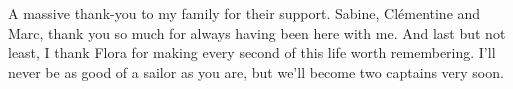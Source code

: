 A massive thank-you to my family for their support. Sabine, Clémentine and Marc, thank you so much for always having been here with me. 
% 
And last but not least, I thank Flora for making every second of this life worth remembering.
% 
I'll never be as good of a sailor as you are, but we'll become two captains very soon.

















